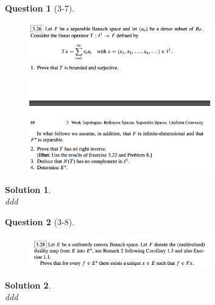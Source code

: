 \documentclass{article} %
\theoremstyle{quest}
\newtheorem*{question}{Question}
\newtheorem*{solution}{Solution}
\begin{document}
\begin{question}[3-7]
\hfill
\begin{figure}[h!]
  \centering
    \includegraphics[width=0.7\textwidth]{func-c3-p7.png}
\end{figure}
\end{question}
\begin{solution} \hfill \\
ddd 
\end{solution}

\newpage

\begin{question}[3-8]
\hfill
\begin{figure}[h!]
  \centering
    \includegraphics[width=0.7\textwidth]{func-c3-p8.png}
\end{figure}
\end{question}
\begin{solution} \hfill \\
ddd 
\end{solution}
\end{document}
